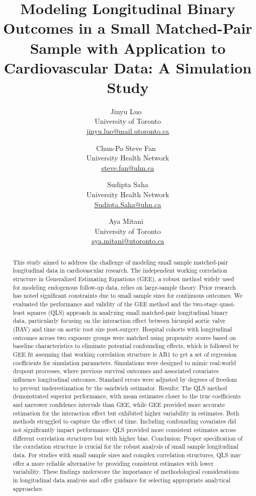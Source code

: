 \documentclass[
]{aft}
\title{Modeling Longitudinal Binary Outcomes in a Small Matched-Pair
Sample with Application to Cardiovascular Data: A Simulation Study}
\author{
Jinyu Luo~\orcidlink{0009-0004-1101-7040}\\University of
Toronto\\\href{mailto:jinyu.luo@mail.utoronto.ca}{jinyu.luo@mail.utoronto.ca}\and 
Chun-Po Steve Fan~\orcidlink{0000-0002-6373-0532}\\University Health
Network\\\href{mailto:steve.fan@uhn.ca}{steve.fan@uhn.ca}\and 
Sudipta Saha\\University Health
Network\\\href{mailto:Sudipta.Saha@uhn.ca}{Sudipta.Saha@uhn.ca}\and 
Aya Mitani~\orcidlink{0000-0002-0373-5032}\\University of
Toronto\\\href{mailto:aya.mitani@utoronto.ca}{aya.mitani@utoronto.ca}}
\date{}
\begin{document}
\maketitle
\begin{abstract}
This study aimed to address the challenge of modeling small sample
matched-pair longitudinal data in cardiovascular research. The
independent working correlation structure in Generalized Estimating
Equations (GEE), a robust method widely used for modeling endogenous
follow-up data, relies on large-sample theory. Prior research has noted
significant constraints due to small sample sizes for continuous
outcomes. We evaluated the performance and validity of the GEE method
and the two-stage quasi-least squares (QLS) approach in analyzing small
matched-pair longitudinal binary data, particularly focusing on the
interaction effect between bicuspid aortic valve (BAV) and time on
aortic root size post-surgery. Hospital cohorts with longitudinal
outcomes across two exposure groups were matched using propensity scores
based on baseline characteristics to eliminate potential confounding
effects, which is followed by GEE fit assuming that working correlation
structure is AR1 to get a set of regression coefficients for simulation
parameters. Simulations were designed to mimic real-world dropout
processes, where previous survival outcomes and associated covariates
influence longitudinal outcomes. Standard errors were adjusted by
degrees of freedom to prevent underestimation by the sandwich estimator.
Results: The QLS method demonstrated superior performance, with mean
estimates closer to the true coefficients and narrower confidence
intervals than GEE, while GEE provided more accurate estimation for the
interaction effect but exhibited higher variability in estimates. Both
methods struggled to capture the effect of time. Including confounding
covariates did not significantly impact performance. QLS provided more
consistent estimates across different correlation structures but with
higher bias. Conclusion: Proper specification of the correlation
structure is crucial for the robust analysis of small sample
longitudinal data. For studies with small sample sizes and complex
correlation structures, QLS may offer a more reliable alternative by
providing consistent estimates with lower variability. These findings
underscore the importance of methodological considerations in
longitudinal data analysis and offer guidance for selecting appropriate
analytical approaches.
\end{abstract}
\end{document}
